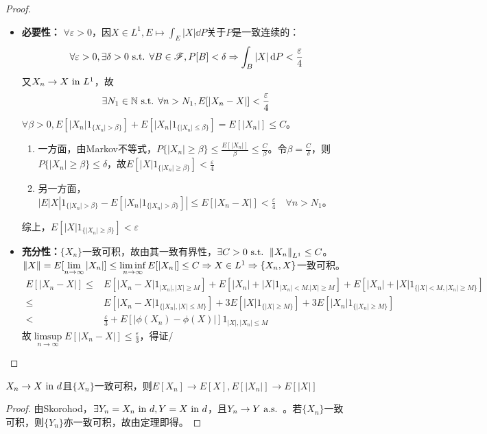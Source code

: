 \documentclass{ctexart}
\begin{document}
\begin{proof}
  \begin{itemize}
  
  \item \textbf{必要性：} $\forall\varepsilon>0$，因$X\in L^{1},E\mapsto \int_{E}|X|\dd P$关于$P$是一致连续的：
    \[\forall\varepsilon>0,\exists \delta>0\text{ s.t. }\forall B\in\mathscr{F}, P[B]<\delta\Rightarrow \int_{B}|X|\,\mathrm{d} P<\frac{\varepsilon}{4}\]
    又$X_{n}\to X\text{ in } L^{1}$，故
    \[\exists N_{1}\in\mathbb{N}\text{ s.t. } \forall n>N_{1}, E[|X_{n}-X|]<\frac{\varepsilon}{4}\]
    $\forall\beta>0, E[|X_{n}|1_{\{X_{n}|>\beta\}}]+E[|X_{n}|1_{\{|X_{n}|\leq\beta\}}]=E[|X_{n}|]\leq C$。
    \begin{enumerate}
    \item 一方面，由Markov不等式，$P\{|X_{n}|\geq \beta\}\leq\frac{E[|X_{n}|]}{\beta}\leq\frac{C}{\beta} $。令$\beta=\frac{C}{\delta}$，则$P\{|X_{n}|\geq \beta\}\leq \delta$，故$E[|X|1_{\{|X_{n}|\geq \beta\}}]<\frac{\varepsilon}{4}$
   
    \item  另一方面，$|E|X|1_{\{|X_{n}|>\beta\}}-E[|X_{n}|1_{\{|X_{n}|>\beta\}}]|\leq E[|X_{n}-X|]<\frac{\varepsilon}{4}\quad\forall n>N_{1}$。
    \end{enumerate}
   综上，$E[|X|1_{\{|X_{n}|\geq \beta\}}]<\varepsilon$

  
 \item \textbf{充分性：}$\{X_{n}\}$一致可积，故由其一致有界性，$\exists C>0\text{ s.t. } \left\|X_{n}\right\|_{L^{1}}\leq C$。$\left\|X\right\|=E[\lim\limits_{n\to\infty}|X_{n}|]\leq \liminf\limits_{n\to\infty}E[|X_{n}|]\leq C\Rightarrow X\in L^{1}\Rightarrow \{X_{n},X\}$一致可积。
\begin{align*}
  E[|X_{n}-X|]\leq& E[|X_{n}-X|1_{|X_{n}|,|X|\geq M}]+E[|X_{n}|+|X|1_{|X_{n}|<M.|X|\geq M}]+E[|X_{n}|+|X|1_{\{|X|<M,|X_{n}|\geq M\}}]\\
  \leq& E[|X_{n}-X|1_{\{|X_{n}|,|X|\leq M\}}]+3E[|X|1_{\{|X|\geq M\}}]+3E[|X_{n}|1_{\{|X_{n}|\geq M\}}]\\
  <&\frac{\varepsilon}{3}+E[|\phi(X_{n})-\phi(X)|]1_{|X|,|X_{n}|\leq M}
\end{align*}
   故$ \limsup\limits_{n\to\infty} E[|X_{n}-X|]\leq\frac{\varepsilon}{3} $，得证/
   \end{itemize}
\end{proof}

\begin{Cor}
  $X_{n}\to X\text{ in } d$且$\{X_{n}\}$一致可积，则$E[X_{n}]\to E[X], E[|X_{n}|]\to E[|X|]$
\end{Cor}

\begin{proof}
  由Skorohod，$\exists Y_{n}=X_{n}\text{ in } d, Y=X\text{ in } d$，且$Y_{n}\to Y\text{ a.s. }$。若$\{X_{n}\}$一致可积，则$\{Y_{n}\}$亦一致可积，故由定理即得。
\end{proof}
\ifx\allfiles\undefined
\end{document}
